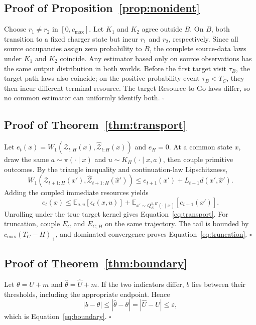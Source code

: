 \subsection{Proof of Proposition~\ref{prop:nonident}}

Choose \(r_1\neq r_2\) in \([0,c_{\max}]\). Let \(K_1\) and \(K_2\) agree outside \(B\). On \(B\), both transition to a fixed charger state but incur \(r_1\) and \(r_2\), respectively. Since all source occupancies assign zero probability to \(B\), the complete source-data laws under \(K_1\) and \(K_2\) coincide. Any estimator based only on source observations has the same output distribution in both worlds. Before the first target visit \(\tau_B\), the target path laws also coincide; on the positive-probability event \(\tau_B<T_C\), they then incur different terminal resource. The target Resource-to-Go laws differ, so no common estimator can uniformly identify both. \(\square\)

\subsection{Proof of Theorem~\ref{thm:transport}}

Let \(e_t(x)=W_1(\mathcal Z_{t:H}(x),\widehat{\mathcal Z}_{t:H}(x))\) and \(e_H=0\). At a common state \(x\), draw the same \(a\sim\pi(\cdot\mid x)\) and \(u\sim K_\Pi(\cdot\mid x,a)\), then couple primitive outcomes. By the triangle inequality and continuation-law Lipschitzness,
\[
W_1\!\left(\mathcal Z_{t+1:H}(x'),\widehat{\mathcal Z}_{t+1:H}(\widehat x')\right)
\leq e_{t+1}(x')+L_{t+1}d(x',\widehat x').
\]
Adding the coupled immediate resources yields
\[
e_t(x)\leq \mathbb E_{a,u}[\epsilon_t(x,u)]
+\mathbb E_{x'\sim Q_K^{\pi,\Pi}(\cdot\mid x)}[e_{t+1}(x')].
\]
Unrolling under the true target kernel gives Equation~\eqref{eq:transport}. For truncation, couple \(E_C\) and \(E_{C,H}\) on the same trajectory. The tail is bounded by \(c_{\max}(T_C-H)_+\), and dominated convergence proves Equation~\eqref{eq:truncation}. \(\square\)

\subsection{Proof of Theorem~\ref{thm:boundary}}

Let \(\theta=U+m\) and \(\widehat\theta=\widehat U+m\). If the two indicators differ, \(b\) lies between their thresholds, including the appropriate endpoint. Hence
\[
|b-\theta|\leq|\widehat\theta-\theta|=|\widehat U-U|\leq\varepsilon,
\]
which is Equation~\eqref{eq:boundary}. \(\square\)

